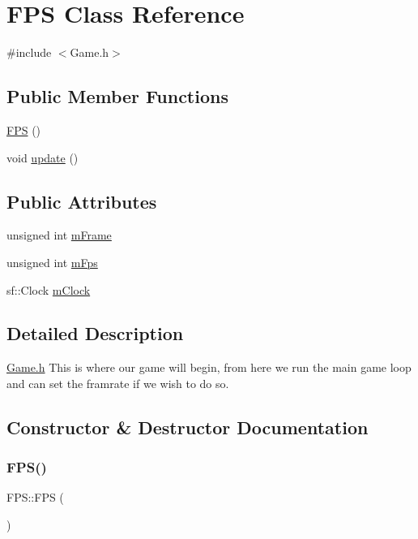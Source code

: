 \hypertarget{class_f_p_s}{}\section{F\+PS Class Reference}
\label{class_f_p_s}


{\ttfamily \#include $<$Game.\+h$>$}

\subsection*{Public Member Functions}
\begin{DoxyCompactItemize}
\item 
\mbox{\hyperlink{class_f_p_s_a731dd05bb14a606dcb40b6414a95d32c}{F\+PS}} ()
\item 
void \mbox{\hyperlink{class_f_p_s_a230d52d9a0b736e73d43100f6441a4bf}{update}} ()
\end{DoxyCompactItemize}
\subsection*{Public Attributes}
\begin{DoxyCompactItemize}
\item 
unsigned int \mbox{\hyperlink{class_f_p_s_aad714ffd7940021e52d054f2335986a2}{m\+Frame}}
\item 
unsigned int \mbox{\hyperlink{class_f_p_s_a1bcf269a7357d4f100abf5eee36e22d2}{m\+Fps}}
\item 
sf\+::\+Clock \mbox{\hyperlink{class_f_p_s_af28828c6a721936d2daf31540883c5fd}{m\+Clock}}
\end{DoxyCompactItemize}


\subsection{Detailed Description}
\mbox{\hyperlink{_game_8h}{Game.\+h}} This is where our game will begin, from here we run the main game loop and can set the framrate if we wish to do so. 

\subsection{Constructor \& Destructor Documentation}
\mbox{\label{class_f_p_s_a731dd05bb14a606dcb40b6414a95d32c}} 
\subsubsection{\texorpdfstring{FPS()}{FPS()}}
{\footnotesize\ttfamily F\+P\+S\+::\+F\+PS (\begin{DoxyParamCaption}{ }\end{DoxyParamCaption})\hspace{0.3cm}{\ttfamily [inline]}}



